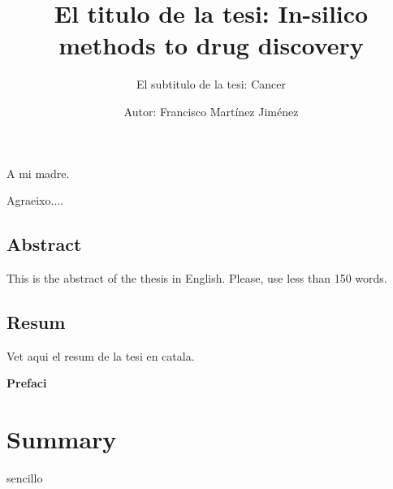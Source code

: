 \documentclass[12pt, a4paper,twoside]{tesi_upf}
\title{El titulo de la tesi: In-silico methods to drug discovery}
\subtitle{El subtitulo de la tesi: Cancer}
\author{Autor: Francisco Mart\'inez Jim\'enez}
\begin{document}
\frontmatter


\maketitle

\cleardoublepage




\noindent A mi madre. 

\cleardoublepage





 Agraeixo....

\cleardoublepage



\section*{\Large \sffamily Abstract}
This is the abstract of the thesis in English.  Please, use less
than 150 words.

\vspace*{\fill}
\section*{\Large \sffamily  Resum}

Vet aqui el resum de la tesi en catala.  
\vspace*{\fill}
\cleardoublepage


{\bf Prefaci}

\cleardoublepage



\tableofcontents


\listoffigures



\listoftables



\mainmatter

\chapter*{Summary}

sencillo
\end{document}

